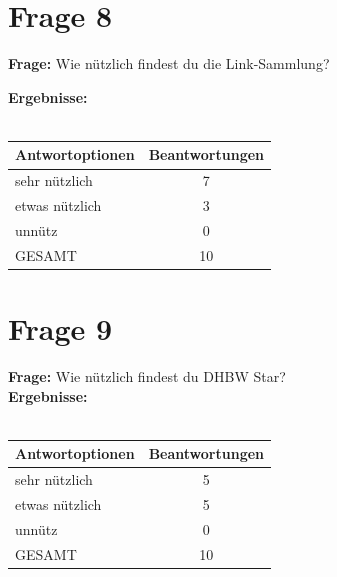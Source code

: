 \section{Frage 8}
\textbf{Frage:} Wie nützlich findest du die Link-Sammlung?
\begin{figure}
	\centering
\end{figure}
\textbf{Ergebnisse:}\\
\\
\begin{tabular}{|l|c|}\hline
	\textbf{Antwortoptionen} & \textbf{Beantwortungen} \\\hline
	sehr nützlich  	& 7 \\\hline
	etwas nützlich	& 3 \\\hline
	unnütz 			& 0 \\\hline
	GESAMT			& 10 \\\hline			
\end{tabular}

\section{Frage 9}
\begin{figure}
	\centering
\end{figure}

\textbf{Frage:} Wie nützlich findest du DHBW Star?\\
\textbf{Ergebnisse:}\\
\\
\begin{tabular}{|l|c|}\hline
	\textbf{Antwortoptionen} & \textbf{Beantwortungen} \\\hline
	sehr nützlich  	& 5 \\\hline
	etwas nützlich	& 5 \\\hline
	unnütz 			& 0 \\\hline
	GESAMT			& 10 \\\hline			
\end{tabular}

